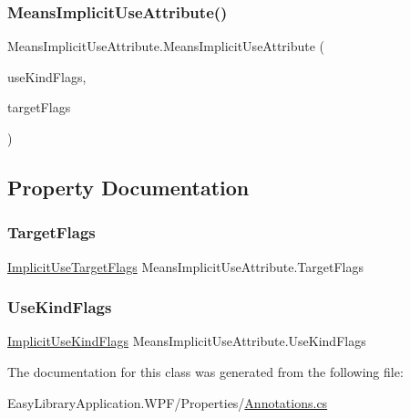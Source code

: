 \subsubsection{\texorpdfstring{Means\+Implicit\+Use\+Attribute()}{MeansImplicitUseAttribute()}\hspace{0.1cm}{\footnotesize\ttfamily [4/4]}}
{\footnotesize\ttfamily Means\+Implicit\+Use\+Attribute.\+Means\+Implicit\+Use\+Attribute (\begin{DoxyParamCaption}\item[{\mbox{\hyperlink{_annotations_8cs_acc26806cec0b003502b38c6c2ee67fd1}{Implicit\+Use\+Kind\+Flags}}}]{use\+Kind\+Flags,  }\item[{\mbox{\hyperlink{_annotations_8cs_a59f21202ead30f3d1e2093e42214bf7c}{Implicit\+Use\+Target\+Flags}}}]{target\+Flags }\end{DoxyParamCaption})}



\subsection{Property Documentation}
\mbox{\label{class_means_implicit_use_attribute_abf0718c3b739197f26771fb693f280ac}} 
\subsubsection{\texorpdfstring{Target\+Flags}{TargetFlags}}
{\footnotesize\ttfamily \mbox{\hyperlink{_annotations_8cs_a59f21202ead30f3d1e2093e42214bf7c}{Implicit\+Use\+Target\+Flags}} Means\+Implicit\+Use\+Attribute.\+Target\+Flags\hspace{0.3cm}{\ttfamily [get]}}

\mbox{\label{class_means_implicit_use_attribute_af242c18a9e6e8db8d83c212231b1cd8c}} 
\subsubsection{\texorpdfstring{Use\+Kind\+Flags}{UseKindFlags}}
{\footnotesize\ttfamily \mbox{\hyperlink{_annotations_8cs_acc26806cec0b003502b38c6c2ee67fd1}{Implicit\+Use\+Kind\+Flags}} Means\+Implicit\+Use\+Attribute.\+Use\+Kind\+Flags\hspace{0.3cm}{\ttfamily [get]}}



The documentation for this class was generated from the following file\+:\begin{DoxyCompactItemize}
\item 
Easy\+Library\+Application.\+W\+P\+F/\+Properties/\mbox{\hyperlink{_annotations_8cs}{Annotations.\+cs}}\end{DoxyCompactItemize}
